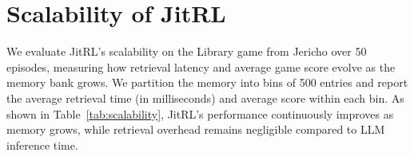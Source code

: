 

\section{Scalability of JitRL}
\label{app:scalability}

We evaluate JitRL's scalability on the Library game from Jericho over 50 episodes, measuring how retrieval latency and average game score evolve as the memory bank grows. We partition the memory into bins of 500 entries and report the average retrieval time (in milliseconds) and average score within each bin. As shown in Table~\ref{tab:scalability}, JitRL's performance continuously improves as memory grows, while retrieval overhead remains negligible compared to LLM inference time.

